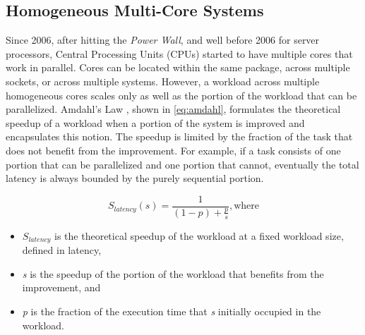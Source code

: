 \subsection{Homogeneous Multi-Core Systems}

Since 2006, after hitting the \textit{Power Wall}, and well before 2006 for server processors, Central Processing Units (CPUs) started to have multiple cores that work in parallel. Cores can be located within the same package, across multiple sockets, or across multiple systems. However, a workload across multiple homogeneous cores scales only as well as the portion of the workload that can be parallelized. Amdahl's Law \cite{amdahl}, shown in \autoref{eq:amdahl}, formulates the theoretical speedup of a workload when a portion of the system is improved and encapsulates this notion. The speedup is limited by the fraction of the task that does not benefit from the improvement. For example, if a task consists of one portion that can be parallelized and one portion that cannot, eventually the total latency is always bounded by the purely sequential portion.

\begin{equation}
  S_{latency}(s) = \frac{1}{(1-p) + \frac{p}{s}}, \text{where}
  \label{eq:amdahl}
\end{equation}

\begin{itemize}
  \item{$S_{latency}$ is the theoretical speedup of the workload at a fixed workload size, defined in latency,}
  \item{\textit{s} is the speedup of the portion of the workload that benefits from the improvement, and}
  \item{\textit{p} is the fraction of the execution time that \textit{s} initially occupied in the workload.}
\end{itemize}

